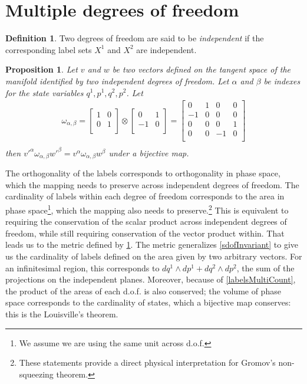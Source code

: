 \documentclass[aps,twocolumn,floatfix,nofootinbib]{revtex4}   %
\newtheorem{prop}[thm]{Proposition}
\theoremstyle{definition}
\newtheorem{defn}[thm]{Definition}
\begin{document}
\section{Multiple degrees of freedom}

\begin{defn}\label{mdof}
Two degrees of freedom are said to be \emph{independent} if the corresponding label sets $X^1$ and $X^2$ are independent.
\end{defn}

\begin{prop}\label{mdofInvariant}
Let $v$ and $w$ be two vectors defined on the tangent space of the manifold identified by two independent degrees of freedom. Let $\alpha$ and $\beta$ be indexes for the state variables $q^1, p^1, q^2, p^2$. Let
\begin{align*}
\omega_{\alpha, \beta} =  \left[
  \begin{array}{cc}
    1 & 0 \\
    0 & 1 \\
  \end{array}
\right] \otimes \left[
  \begin{array}{cc}
    0 & 1 \\
    -1 & 0 \\
  \end{array}
\right] =
\left[
  \begin{array}{cccc}
    0 & 1 & 0 & 0 \\
    -1 & 0 & 0 & 0 \\
    0 & 0 & 0 & 1 \\
    0 & 0 & -1 & 0 \\
  \end{array}
\right] \\
\end{align*}
then $v'^{\alpha} \omega_{\alpha, \beta} w'^{\beta}=v^{\alpha} \omega_{\alpha, \beta} w^{\beta}$ under a bijective map.
\end{prop}

The orthogonality of the labels corresponds to orthogonality in phase space, which the mapping needs to preserve across independent degrees of freedom. The cardinality of labels within each degree of freedom corresponds to the area in phase space\footnote{We assume we are using the same unit across d.o.f.}, which the mapping also needs to preserve.\footnote{These statements provide a direct physical interpretation for Gromov's non-squeezing theorem\cite{Gromov,deGosson,Stewart}.} This is equivalent to requiring the conservation of the scalar product across independent degrees of freedom, while still requiring conservation of the vector product within. That leads us to the metric defined by \ref{mdofInvariant}.
The metric generalizes \ref{sdofInvariant} to give us the cardinality of labels defined on the area given by two arbitrary vectors. For an infinitesimal region, this corresponds to $dq^1 \wedge dp^1 + dq^2 \wedge dp^2$, the sum of the projections on the independent planes. Moreover, because of \ref{labelsMultiCount}, the product of the areas of each d.o.f. is also conserved; the volume of phase space corresponds to the cardinality of states, which a bijective map conserves: this is the Louisville's theorem.
\end{document}
